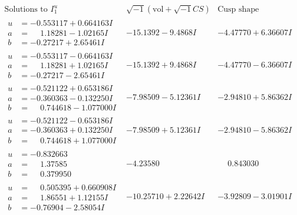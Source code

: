 \documentclass[1p]{elsarticle_modified}
\theoremstyle{definition}
\newcommand{\I}{\sqrt{-1}}
\begin{document}
$$\begin{array}{c|c|c}  
\text{Solutions to }I^u_{1}& \I (\text{vol} + \sqrt{-1}CS) & \text{Cusp shape}\\
 \hline 
\begin{aligned}
u &= -0.553117 + 0.664163 I \\
a &= \phantom{-}1.18281 - 1.02165 I \\
b &= -0.27217 + 2.65461 I\end{aligned}
 & -15.1392 - 9.4868 I & -4.47770 + 6.36607 I \\ \hline\begin{aligned}
u &= -0.553117 - 0.664163 I \\
a &= \phantom{-}1.18281 + 1.02165 I \\
b &= -0.27217 - 2.65461 I\end{aligned}
 & -15.1392 + 9.4868 I & -4.47770 - 6.36607 I \\ \hline\begin{aligned}
u &= -0.521122 + 0.653186 I \\
a &= -0.360363 - 0.132250 I \\
b &= \phantom{-}0.744618 - 1.077000 I\end{aligned}
 & -7.98509 - 5.12361 I & -2.94810 + 5.86362 I \\ \hline\begin{aligned}
u &= -0.521122 - 0.653186 I \\
a &= -0.360363 + 0.132250 I \\
b &= \phantom{-}0.744618 + 1.077000 I\end{aligned}
 & -7.98509 + 5.12361 I & -2.94810 - 5.86362 I \\ \hline\begin{aligned}
u &= -0.832663\phantom{ +0.000000I} \\
a &= \phantom{-}1.37585\phantom{ +0.000000I} \\
b &= \phantom{-}0.379950\phantom{ +0.000000I}\end{aligned}
 & -4.23580\phantom{ +0.000000I} & \phantom{-}0.843030\phantom{ +0.000000I} \\ \hline\begin{aligned}
u &= \phantom{-}0.505395 + 0.660908 I \\
a &= \phantom{-}1.86551 + 1.12155 I \\
b &= -0.76904 - 2.58054 I\end{aligned}
 & -10.25710 + 2.22642 I & -3.92809 - 3.01901 I \\ \hline\begin{aligned}

\end{aligned}
\end{array}$$
\end{document}
